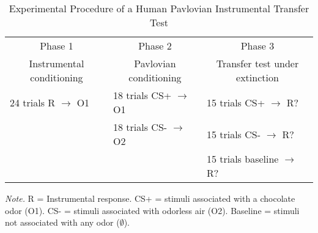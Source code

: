 \medskip
\setlength{\tabcolsep}{12pt}
\begin{table}[h!]
\centering
\caption{\\Experimental Procedure of a Human Pavlovian Instrumental Transfer Test}
\begin{adjustbox}{max width=1\textwidth,center}
\begin{tabular}{lll}
&                       \\
\toprule
\multicolumn{1}{c}{Phase 1} & \multicolumn{1}{c}{Phase 2} &\multicolumn{1}{c}{Phase 3}\\
\multicolumn{1}{c}{Instrumental conditioning} & \multicolumn{1}{c}{ Pavlovian conditioning} &\multicolumn{1}{c}{Transfer test under extinction}\\
\midrule
24 trials R $\rightarrow$ O1  
& 18 trials CS+ $\rightarrow$ O1 
& 15 trials CS+ $\rightarrow$ R?            \\
& 18 trials CS- $\rightarrow$ O2 
& 15 trials CS- $\rightarrow$ R?            \\
& 
& 15 trials baseline $\rightarrow$ R?            \\
\midrule
\end{tabular}
\end{adjustbox}
\vspace{.05in}	
\begin{tablenotes}
\noindent
\scriptsize
\begin{flushleft}
\textit{Note.} R = Instrumental response. CS+ = stimuli associated with a chocolate odor (O1). CS- = stimuli associated with odorless air (O2). Baseline = stimuli not associated with any odor ($\emptyset$).
\end{flushleft}
\end{tablenotes}
\label{tab:task}
\end{table}
